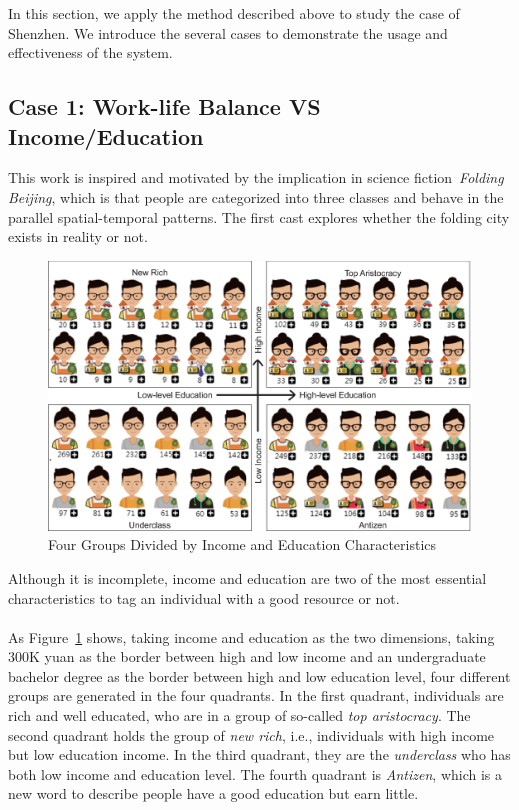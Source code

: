 In this section, we apply the method described above to study the case of Shenzhen. We introduce the several cases to demonstrate the usage and effectiveness of the system.

\subsection{Case 1: Work-life Balance VS Income/Education}

This work is inspired and motivated by the implication in science fiction~\textit{Folding Beijing}, which is that people are categorized into three classes and behave in the parallel spatial-temporal patterns. The first cast explores whether the folding city exists in reality or not.

\begin{figure}[htb!]
 \centering
 \includegraphics[width=\columnwidth]{pictures/case1_1}
 \caption{Four Groups Divided by Income and Education Characteristics}
 \label{case11}
\end{figure}

Although it is incomplete, income and education are two of the most essential characteristics to tag an individual with a good resource or not.\\
\\
As Figure~\ref{case11} shows, taking income and education as the two dimensions, taking 300K yuan as the border between high and low income and an undergraduate bachelor degree as the border between high and low education level, four different groups are generated in the four quadrants. In the first quadrant, individuals are rich and well educated, who are in a group of so-called \textit{top aristocracy}. The second quadrant holds the group of \textit{new rich}, i.e., individuals with high income but low education income. In the third quadrant, they are the \textit{underclass} who has both low income and education level. The fourth quadrant is \textit{Antizen}, which is a new word to describe people have a good education but earn little.



